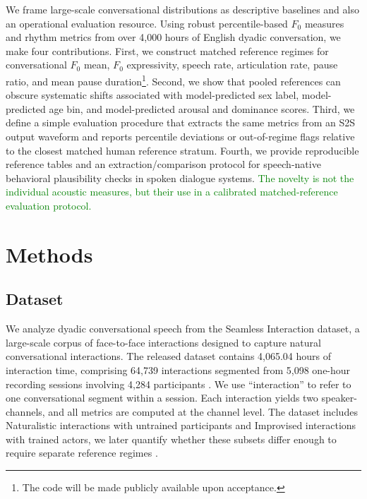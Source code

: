 \documentclass[conference]{IEEEtran}
\begin{document}
We frame large-scale conversational distributions as descriptive baselines and also an operational evaluation resource. 
Using robust percentile-based $F_0$ measures and rhythm metrics from over 4{,}000 hours of English dyadic conversation, we make four contributions. 
First, we construct matched reference regimes for conversational $F_0$ mean, $F_0$ expressivity, speech rate, articulation rate, pause ratio, and mean pause duration\footnote{The code will be made publicly available upon acceptance.}. 
Second, we show that pooled references can obscure systematic shifts associated with model-predicted sex label, model-predicted age bin, and model-predicted arousal and dominance scores. 
Third, we define a simple evaluation procedure that extracts the same metrics from an S2S output waveform and reports percentile deviations or out-of-regime flags relative to the closest matched human reference stratum. 
Fourth, we provide reproducible reference tables and an extraction/comparison protocol for speech-native behavioral plausibility checks in spoken dialogue systems.
\textcolor{green}{The novelty is not the individual acoustic measures, but their use in a calibrated matched-reference evaluation protocol.}

\section{Methods}
\label{sec:methods}

\subsection{Dataset}
We analyze dyadic conversational speech from the Seamless Interaction dataset, a large-scale corpus of face-to-face interactions designed to capture natural conversational interactions.
The released dataset contains 4,065.04 hours of interaction time, comprising 64,739 interactions segmented from 5,098 one-hour recording sessions involving 4,284 participants \cite{seamless_interaction}. 
We use ``interaction'' to refer to one conversational segment within a session. 
Each interaction yields two speaker-channels, and all metrics are computed at the channel level. 
The dataset includes Naturalistic interactions with untrained participants and Improvised interactions with trained actors, we later quantify whether these subsets differ enough to require separate reference regimes \cite{fusaroli_dialog_2014, wynn_conversational_2024}.
\end{document}
